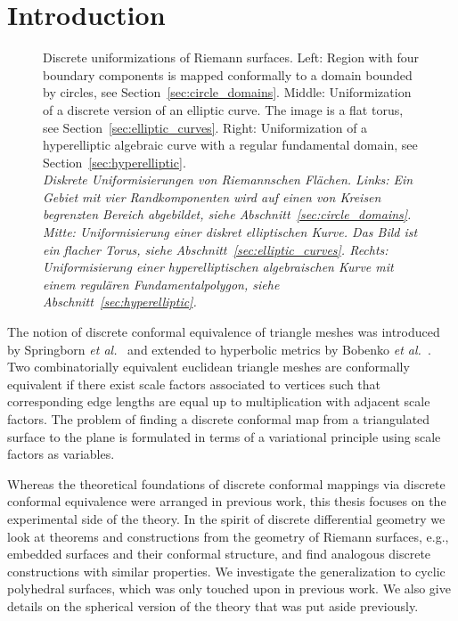 \documentclass[Thesis.tex]{subfiles}
\begin{document}
\chapter{Introduction}

\begin{figure}
\centering
{}
\caption{
Discrete uniformizations of Riemann surfaces. 
Left: Region with four boundary components is mapped conformally to a domain bounded by circles, see Section~\ref{sec:circle_domains}. 
Middle: Uniformization of a discrete version of an elliptic curve. The image is a flat torus, see Section~\ref{sec:elliptic_curves}. 
Right: Uniformization of a hyperelliptic algebraic curve with a regular fundamental domain, see Section~\ref{sec:hyperelliptic}.\\
\it Diskrete Uniformisierungen von Riemannschen Fl\"{a}chen. 
Links: Ein Gebiet mit vier Randkomponenten wird auf einen von Kreisen begrenzten Bereich abgebildet, siehe Abschnitt~\ref{sec:circle_domains}.
Mitte: Uniformisierung einer diskret elliptischen Kurve. Das Bild ist ein flacher Torus, siehe Abschnitt~\ref{sec:elliptic_curves}.
Rechts: Uniformisierung einer hyperelliptischen algebraischen Kurve mit einem regul\"{a}ren Fundamentalpolygon, siehe Abschnitt~\ref{sec:hyperelliptic}.
}
\label{fig:intro_uniformizations} 
\end{figure}

The notion of discrete conformal equivalence of triangle meshes was introduced by Springborn {\it et al.}~\cite{Springborn2008} and extended to hyperbolic metrics by Bobenko {\it et al.}~\cite{BPS2015:dconf}. 
Two combinatorially equivalent euclidean triangle meshes are conformally equivalent if there exist scale factors associated to vertices such that corresponding edge lengths are equal up to multiplication with adjacent scale factors.
The problem of finding a discrete conformal map from a triangulated surface to the plane is formulated in terms of a variational principle using scale factors as variables.

Whereas the theoretical foundations of discrete conformal mappings via discrete conformal equivalence were arranged in previous work, this thesis focuses on the experimental side of the theory. 
In the spirit of discrete differential geometry we look at theorems and constructions from the geometry of Riemann surfaces, e.g., embedded surfaces and their conformal structure, and find analogous discrete constructions with similar properties.
We investigate the generalization to cyclic polyhedral surfaces, which was only touched upon in previous work.
We also give details on the spherical version of the theory that was put aside previously.
\end{document}
